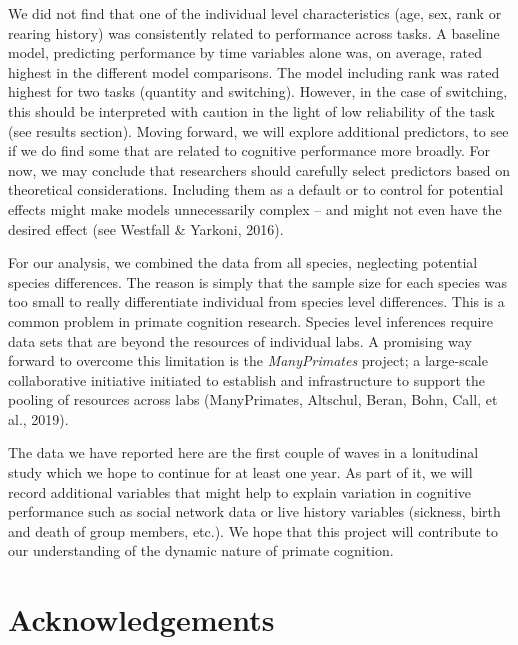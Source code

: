 \documentclass[10pt, letterpaper]{article}
\begin{document}
We did not find that one of the individual level characteristics (age,
sex, rank or rearing history) was consistently related to performance
across tasks. A baseline model, predicting performance by time variables
alone was, on average, rated highest in the different model comparisons.
The model including rank was rated highest for two tasks (quantity and
switching). However, in the case of switching, this should be
interpreted with caution in the light of low reliability of the task
(see results section). Moving forward, we will explore additional
predictors, to see if we do find some that are related to cognitive
performance more broadly. For now, we may conclude that researchers
should carefully select predictors based on theoretical considerations.
Including them as a default or to control for potential effects might
make models unnecessarily complex -- and might not even have the desired
effect (see Westfall \& Yarkoni, 2016).

For our analysis, we combined the data from all species, neglecting
potential species differences. The reason is simply that the sample size
for each species was too small to really differentiate individual from
species level differences. This is a common problem in primate cognition
research. Species level inferences require data sets that are beyond the
resources of individual labs. A promising way forward to overcome this
limitation is the \emph{ManyPrimates} project; a large-scale
collaborative initiative initiated to establish and infrastructure to
support the pooling of resources across labs (ManyPrimates, Altschul,
Beran, Bohn, Call, et al., 2019).

The data we have reported here are the first couple of waves in a
lonitudinal study which we hope to continue for at least one year. As
part of it, we will record additional variables that might help to
explain variation in cognitive performance such as social network data
or live history variables (sickness, birth and death of group members,
etc.). We hope that this project will contribute to our understanding of
the dynamic nature of primate cognition.

\vspace{1em}

\vspace{1em}

\hypertarget{acknowledgements}{%
\section{Acknowledgements}\label{acknowledgements}}
\end{document}
